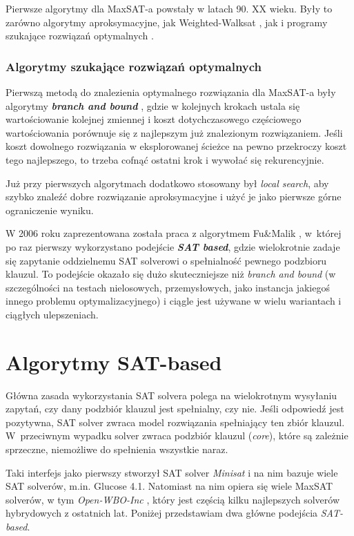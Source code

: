 \documentclass[shortabstract]{iithesis}
\begin{document}
Pierwsze algorytmy dla MaxSAT-a powstały w latach 90. XX wieku. Były to zarówno algorytmy aproksymacyjne, jak Weighted-Walksat \cite{walksat}, jak i programy szukające rozwiązań optymalnych \cite{twophase}.

\subsubsection{Algorytmy szukające rozwiązań optymalnych}
Pierwszą metodą do znalezienia optymalnego rozwiązania dla MaxSAT-a były algorytmy \textit{\textbf{branch and bound}} \cite{twophase}\cite{bab}, gdzie w kolejnych krokach ustala się wartościowanie kolejnej zmiennej i koszt dotychczasowego częściowego wartościowania porównuje się z najlepszym już znalezionym rozwiązaniem. Jeśli koszt dowolnego rozwiązania w eksplorowanej ścieżce na pewno przekroczy koszt tego najlepszego, to trzeba cofnąć ostatni krok i wywołać się rekurencyjnie.

Już przy pierwszych algorytmach dodatkowo stosowany był \textit{local search}, aby szybko znaleźć dobre rozwiązanie aproksymacyjne i użyć je jako pierwsze górne ograniczenie wyniku.

W 2006 roku zaprezentowana została praca z algorytmem Fu\&Malik \cite{fumalik}, w~której po raz pierwszy wykorzystano podejście \textit{\textbf{SAT based}}, gdzie wielokrotnie zadaje się zapytanie oddzielnemu SAT solverowi o spełnialność pewnego podzbioru klauzul. To podejście okazało się dużo skuteczniejsze niż \textit{branch and bound} (w szczególności na testach nielosowych, przemysłowych, jako instancja jakiegoś innego problemu optymalizacyjnego) i ciągle jest używane w wielu wariantach i ciągłych ulepszeniach.

\section{Algorytmy SAT-based}
Główna zasada wykorzystania SAT solvera polega na wielokrotnym wysyłaniu zapytań, czy dany podzbiór klauzul jest spełnialny, czy nie. Jeśli odpowiedź jest pozytywna, SAT solver zwraca model rozwiązania spełniający ten zbiór klauzul. W~przeciwnym wypadku solver zwraca podzbiór klauzul (\textit{core}), które są zależnie sprzeczne, niemożliwe do spełnienia wszystkie naraz.

Taki interfejs jako pierwszy stworzył SAT solver \textit{Minisat} i na nim bazuje wiele SAT solverów, m.in. {Glucose 4.1}. Natomiast na nim opiera się wiele MaxSAT solverów, w tym \textit{Open-WBO-Inc} \cite{openwbo}, który jest częścią kilku najlepszych solverów hybrydowych z ostatnich lat. 
Poniżej przedstawiam dwa główne podejścia \textit{SAT-based}.
\end{document}
